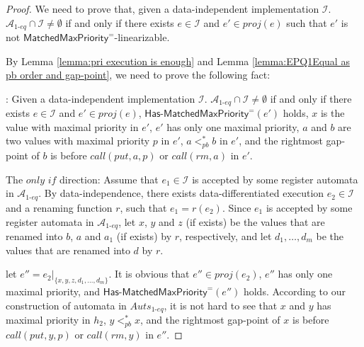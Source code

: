 \begin {proof} 

We need to prove that, given a data-independent implementation $\mathcal{I}$. $\mathcal{A}_{\textit{1-eq}} \cap \mathcal{I} \neq \emptyset$ if and only if there exists $e \in \mathcal{I}$ and $e' \in \textit{proj}(e)$ such that $e'$ is not $\mathsf{MatchedMaxPriority}^{=}$-linearizable.

By Lemma \ref{lemma:pri execution is enough} and Lemma \ref{lemma:EPQ1Equal as pb order and gap-point}, we need to prove the following fact:

: Given a data-independent implementation $\mathcal{I}$. $\mathcal{A}_{\textit{1-eq}} \cap \mathcal{I} \neq \emptyset$ if and only if there exists $e \in \mathcal{I}$ and $e' \in \textit{proj}(e)$, $\mathsf{Has\text{-}MatchedMaxPriority}^{=}(e')$ holds, $x$ is the value with maximal priority in $e'$, $e'$ has only one maximal priority, $a$ and $b$ are two values with maximal priority $p$ in $e'$, $a <_{\textit{pb}}^* b$ in $e'$, and the rightmost gap-point of $b$ is before $\textit{call}(\textit{put},a,p)$ or $\textit{call}(\textit{rm},a)$ in $e'$.

\noindent The $\textit{only if}$ direction: Assume that $e_1 \in \mathcal{I}$ is accepted by some register automata in $\mathcal{A}_{\textit{1-eq}}$. By data-independence, there exists data-differentiated execution $e_2 \in \mathcal{I}$ and a renaming function $r$, such that $e_1=r(e_2)$. Since $e_1$ is accepted by some register automata in  $\mathcal{A}_{\textit{1-eq}}$, let $x$, $y$ and $z$ (if exists) be the values that are renamed into $b$, $a$ and $a_1$ (if exists) by $r$, respectively, and let $d_1,\ldots,d_m$ be the values that are renamed into $d$ by $r$.

let $e'' = e_2 \vert_{ \{ x,y,z,d_1,\ldots,d_m \} }$. It is obvious that $e'' \in \textit{proj}(e_2)$, $e''$ has only one maximal priority, and $\mathsf{Has\text{-}MatchedMaxPriority}^{=}(e'')$ holds. According to our construction of automata in $\textit{Auts}_{\textit{1-eq}}$, it is not hard to see that $x$ and $y$ has maximal priority in $h_2$, $y <_{\textit{pb}}^* x$, and the rightmost gap-point of $x$ is before $\textit{call}(\textit{put},y,p)$ or $\textit{call}(\textit{rm},y)$ in $e''$.


\end{proof}
